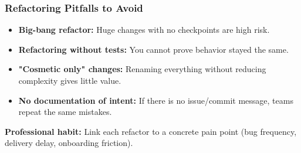 \documentclass[xcolor=table]{beamer}
\begin{document}



\begin{frame}
    \frametitle{Refactoring Pitfalls to Avoid}
    \begin{itemize}
        \item \textbf{Big-bang refactor:} Huge changes with no checkpoints are high risk.
        \item \textbf{Refactoring without tests:} You cannot prove behavior stayed the same.
        \item \textbf{"Cosmetic only" changes:} Renaming everything without reducing complexity gives little value.
        \item \textbf{No documentation of intent:} If there is no issue/commit message, teams repeat the same mistakes.
    \end{itemize}

    \vspace{0.2cm}
    \textbf{Professional habit:} Link each refactor to a concrete pain point (bug frequency, delivery delay, onboarding friction).
\end{frame}
\end{document}

